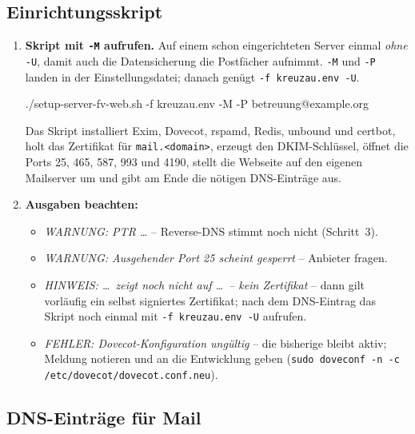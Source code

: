 \documentclass[a4paper,fontsize=10pt]{scrartcl}
\newcommand*{\cmd}[1]{\texttt{#1}}
\newcommand*{\erledigt}{\makebox[1.4em][l]{\setlength{\fboxsep}{0pt}\fbox{\rule{0pt}{0.7em}\hspace{0.7em}}}}
\begin{document}
\subsection{Einrichtungsskript}

\begin{enumerate}[resume]
  \item \erledigt\textbf{Skript mit \cmd{-M} aufrufen.} Auf einem schon eingerichteten Server
        einmal \emph{ohne} \cmd{-U}, damit auch die Datensicherung die Postfächer
        aufnimmt. \cmd{-M} und \cmd{-P} landen in der Einstellungsdatei; danach genügt
        \cmd{-f kreuzau.env -U}.
\begin{befehl}
./setup-server-fv-web.sh -f kreuzau.env -M -P betreuung@example.org
\end{befehl}
        Das Skript installiert Exim, Dovecot, rspamd, Redis, unbound und certbot,
        holt das Zertifikat für \cmd{mail.<domain>}, erzeugt den DKIM-Schlüssel, öffnet
        die Ports 25, 465, 587, 993 und 4190, stellt die Webseite auf den eigenen
        Mailserver um und gibt am Ende die nötigen DNS-Einträge aus.
  \item \erledigt\textbf{Ausgaben beachten:}
    \begin{itemize}
      \item \emph{WARNUNG: PTR \dots} -- Reverse-DNS stimmt noch nicht (Schritt~3).
      \item \emph{WARNUNG: Ausgehender Port 25 scheint gesperrt} -- Anbieter fragen.
      \item \emph{HINWEIS: \dots\ zeigt noch nicht auf \dots\ – kein Zertifikat} -- dann
            gilt vorläufig ein selbst signiertes Zertifikat; nach dem DNS-Eintrag das
            Skript noch einmal mit \cmd{-f kreuzau.env -U} aufrufen.
      \item \emph{FEHLER: Dovecot-Konfiguration ungültig} -- die bisherige bleibt aktiv;
            Meldung notieren und an die Entwicklung geben (\cmd{sudo doveconf -n -c
            /etc/dovecot/dovecot.conf.neu}).
    \end{itemize}
\end{enumerate}

\subsection{DNS-Einträge für Mail}
\end{document}
